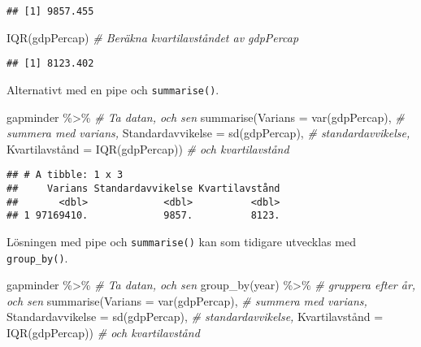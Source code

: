 \documentclass[
]{book}
\newenvironment{Shaded}{\begin{snugshade}}{\end{snugshade}}
\newcommand{\AttributeTok}[1]{\textcolor[rgb]{0.77,0.63,0.00}{#1}}
\newcommand{\CommentTok}[1]{\textcolor[rgb]{0.56,0.35,0.01}{\textit{#1}}}
\newcommand{\FunctionTok}[1]{\textcolor[rgb]{0.00,0.00,0.00}{#1}}
\newcommand{\NormalTok}[1]{#1}
\newcommand{\OtherTok}[1]{\textcolor[rgb]{0.56,0.35,0.01}{#1}}
\newcommand{\SpecialCharTok}[1]{\textcolor[rgb]{0.00,0.00,0.00}{#1}}
\theoremstyle{definition}
\theoremstyle{definition}
\theoremstyle{definition}
\theoremstyle{definition}
\theoremstyle{remark}
\begin{document}
\begin{verbatim}
## [1] 9857.455
\end{verbatim}

\begin{Shaded}
\begin{Highlighting}[]
\FunctionTok{IQR}\NormalTok{(gdpPercap)                                   }\CommentTok{\# Beräkna kvartilavståndet av gdpPercap}
\end{Highlighting}
\end{Shaded}

\begin{verbatim}
## [1] 8123.402
\end{verbatim}

Alternativt med en pipe och \texttt{summarise()}.

\begin{Shaded}
\begin{Highlighting}[]
\NormalTok{gapminder }\SpecialCharTok{\%\textgreater{}\%}                                    \CommentTok{\# Ta datan, och sen}
  \FunctionTok{summarise}\NormalTok{(}\AttributeTok{Varians =} \FunctionTok{var}\NormalTok{(gdpPercap),            }\CommentTok{\# summera med varians,}
            \AttributeTok{Standardavvikelse =} \FunctionTok{sd}\NormalTok{(gdpPercap),   }\CommentTok{\# standardavvikelse,}
\NormalTok{            Kvartilavstånd }\OtherTok{=} \FunctionTok{IQR}\NormalTok{(gdpPercap))     }\CommentTok{\# och kvartilavstånd}
\end{Highlighting}
\end{Shaded}

\begin{verbatim}
## # A tibble: 1 x 3
##     Varians Standardavvikelse Kvartilavstånd
##       <dbl>             <dbl>          <dbl>
## 1 97169410.             9857.          8123.
\end{verbatim}

Lösningen med pipe och \texttt{summarise()} kan som tidigare utvecklas med \texttt{group\_by()}.

\begin{Shaded}
\begin{Highlighting}[]
\NormalTok{gapminder }\SpecialCharTok{\%\textgreater{}\%}                                    \CommentTok{\# Ta datan, och sen}
  \FunctionTok{group\_by}\NormalTok{(year) }\SpecialCharTok{\%\textgreater{}\%}                             \CommentTok{\# gruppera efter år, och sen}
  \FunctionTok{summarise}\NormalTok{(}\AttributeTok{Varians =} \FunctionTok{var}\NormalTok{(gdpPercap),            }\CommentTok{\# summera med varians,}
            \AttributeTok{Standardavvikelse =} \FunctionTok{sd}\NormalTok{(gdpPercap),   }\CommentTok{\# standardavvikelse,}
\NormalTok{            Kvartilavstånd }\OtherTok{=} \FunctionTok{IQR}\NormalTok{(gdpPercap))     }\CommentTok{\# och kvartilavstånd}
\end{Highlighting}
\end{Shaded}
\end{document}
